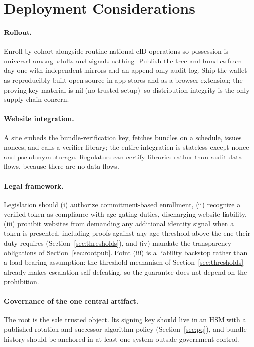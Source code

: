 \documentclass[11pt]{article}
\theoremstyle{definition}
\begin{document}
\section{Deployment Considerations}
\label{sec:deploy}

\paragraph{Rollout.} Enroll by cohort alongside routine national eID operations so
possession is universal among adults and signals nothing. Publish the tree and bundles
from day one with independent mirrors and an append-only audit log. Ship the wallet as
reproducibly built open source in app stores and as a browser extension; the proving key
material is nil (no trusted setup), so distribution integrity is the only supply-chain
concern.

\paragraph{Website integration.} A site embeds the bundle-verification key, fetches
bundles on a schedule, issues nonces, and calls a verifier library; the entire integration
is stateless except nonce and pseudonym storage. Regulators can certify libraries rather
than audit data flows, because there are no data flows.

\paragraph{Legal framework.} Legislation should (i) authorize commitment-based enrollment,
(ii) recognize a verified token as compliance with age-gating duties, discharging website
liability, (iii) prohibit websites from demanding any additional identity signal when a
token is presented, including proofs against any age threshold above the one their duty
requires (Section~\ref{sec:thresholds}), and (iv) mandate the transparency obligations of
Section~\ref{sec:rootpub}. Point (iii) is a liability backstop rather than a load-bearing
assumption: the threshold mechanism of Section~\ref{sec:thresholds} already makes escalation
self-defeating, so the guarantee does not depend on the prohibition.

\paragraph{Governance of the one central artifact.} The root is the sole trusted object.
Its signing key should live in an HSM with a published rotation and successor-algorithm
policy (Section~\ref{sec:pq}), and bundle history should be anchored in at least one
system outside government control.
\end{document}
